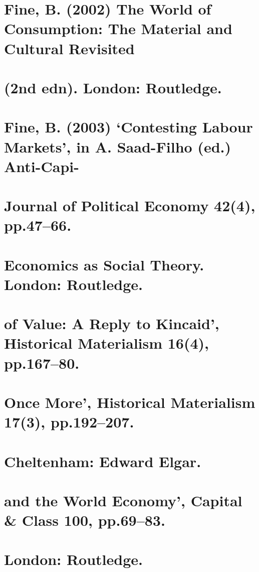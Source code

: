 \section{Fine, B. (2002) The World of Consumption: The Material and Cultural Revisited}


\section{(2nd edn). London: Routledge.}


\section{Fine, B. (2003) ‘Contesting Labour Markets’, in A. Saad-Filho (ed.) Anti-Capi-}


\section{Journal of Political Economy 42(4), pp.47–66.}


\section{Economics as Social Theory. London: Routledge.}


\section{of Value: A Reply to Kincaid’, Historical Materialism 16(4), pp.167–80.}


\section{Once More’, Historical Materialism 17(3), pp.192–207.}


\section{Cheltenham: Edward Elgar.}


\section{and the World Economy’, Capital & Class 100, pp.69–83.}


\section{London: Routledge.}



